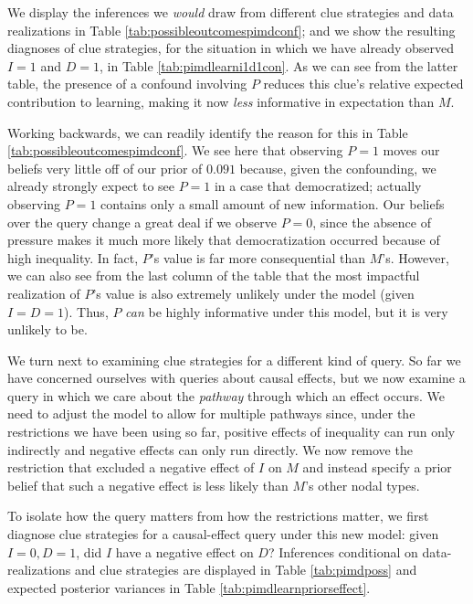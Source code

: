 \documentclass[
  12pt,
]{book}
\begin{document}
We display the inferences we \emph{would} draw from different clue strategies and data realizations in Table \ref{tab:possibleoutcomespimdconf}; and we show the resulting diagnoses of clue strategies, for the situation in which we have already observed \(I=1\) and \(D=1\), in Table \ref{tab:pimdlearni1d1con}. As we can see from the latter table, the presence of a confound involving \(P\) reduces this clue's relative expected contribution to learning, making it now \emph{less} informative in expectation than \(M\).

Working backwards, we can readily identify the reason for this in Table \ref{tab:possibleoutcomespimdconf}. We see here that observing \(P=1\) moves our beliefs very little off of our prior of \(0.091\) because, given the confounding, we already strongly expect to see \(P=1\) in a case that democratized; actually observing \(P=1\) contains only a small amount of new information. Our beliefs over the query change a great deal if we observe \(P=0\), since the absence of pressure makes it much more likely that democratization occurred because of high inequality. In fact, \(P\)'s value is far more consequential than \(M\)'s. However, we can also see from the last column of the table that the most impactful realization of \(P\)'s value is also extremely unlikely under the model (given \(I=D=1\)). Thus, \(P\) \emph{can} be highly informative under this model, but it is very unlikely to be.

We turn next to examining clue strategies for a different kind of query. So far we have concerned ourselves with queries about causal effects, but we now examine a query in which we care about the \emph{pathway} through which an effect occurs. We need to adjust the model to allow for multiple pathways since, under the restrictions we have been using so far, positive effects of inequality can run only indirectly and negative effects can only run directly. We now remove the restriction that excluded a negative effect of \(I\) on \(M\) and instead specify a prior belief that such a negative effect is less likely than \(M\)'s other nodal types.

To isolate how the query matters from how the restrictions matter, we first diagnose clue strategies for a causal-effect query under this new model: given \(I=0, D=1\), did \(I\) have a negative effect on \(D\)? Inferences conditional on data-realizations and clue strategies are displayed in Table \ref{tab:pimdposs} and expected posterior variances in Table \ref{tab:pimdlearnpriorseffect}.
\end{document}

